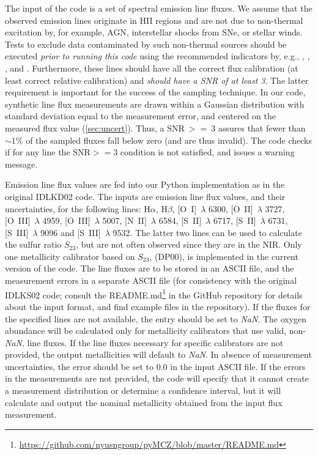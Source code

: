 \documentclass{emulateapj}
\newcommand{\ha}{\ensuremath{\mathrm{H}\alpha}}
\newcommand{\hb}{\ensuremath{\mathrm{H}\beta}}
\begin{document}
The input of the code is a set of spectral emission line fluxes. We
assume that the observed emission lines originate in HII regions and
are not due to non-thermal excitation by, for example, AGN,
interstellar shocks from SNe, or stellar winds.  Tests to exclude data
contaminated by such non-thermal sources should be executed
\emph{prior to running this code} using the recommended indicators by,
e.g., \citet{baldwin81}, \citet{kauffmann03}, \citet{kewley06_sdss},
and \citet{cidfernandes10,sanchez15}. Furthermore, these lines should
have all the correct flux calibration (at least correct relative
calibration) and \emph{should have a SNR of at
  least 3}.
%
The latter requirement is important for the success of the sampling
technique. In our code, synthetic line flux measurements are drawn
within a Gaussian distribution with standard deviation equal to the
measurement error, and centered on the measured flux value
(\autoref{sec:uncert}). Thus, a $\mathrm{SNR}~ >= ~3$ assures that
fewer than $\sim1\%$ of the sampled fluxes fall below zero (and are
thus invalid).  The code checks if for any line the $\mathrm{SNR} >=
3$ condition is not satisfied, and issues a warning message.

Emission line flux values are fed into our Python implementation as in
the original IDLKD02 code. The inputs are emission line flux values,
and their uncertainties, for the following lines: \ha, \hb,
[O~I]~$\lambda$ 6300, [O~II]~$\lambda$ 3727, [O~III]~$\lambda$ 4959,
[O~III]~$\lambda$ 5007, [N~II]~$\lambda$ 6584, [S~II]~$\lambda$ 6717,
[S~II]~$\lambda$ 6731, [S~III]~$\lambda$ 9096 and [S~III]~$\lambda$
9532. The latter two lines can be used to calculate the sulfur ratio
%
$S_{23}$, 
%
but are not often observed since they are in the NIR. Only one
metallicity calibrator based on $S_{23}$, \citealt{diaz00} (DP00), is
implemented in the current version of the code.  The line fluxes are
to be stored in an ASCII file, and the measurement errors in a
separate ASCII file (for consistency with the original IDLKS02 code;
consult the
README.md\footnote{\url{https://github.com/nyusngroup/pyMCZ/blob/master/README.md}}
in the GitHub repository for details about the input format, and find
example files in the repository).  If the fluxes for the specified
lines are not available, the entry should be set to \emph{NaN}. The
oxygen abundance will be calculated only for metallicity calibrators
that use valid, non-\emph{NaN}, line fluxes.  If the line fluxes
necessary for specific calibrators are not provided, the output
metallicities will default to \emph{NaN}. In absence of measurement
uncertainties, the error should be set to 0.0 in the input ASCII
file. If the errors in the measurements are not provided, the code
will specify that it cannot create a measurement distribution or
determine a confidence interval, but it will calculate and output the
nominal metallicity obtained from the input flux measurement.
\end{document}
